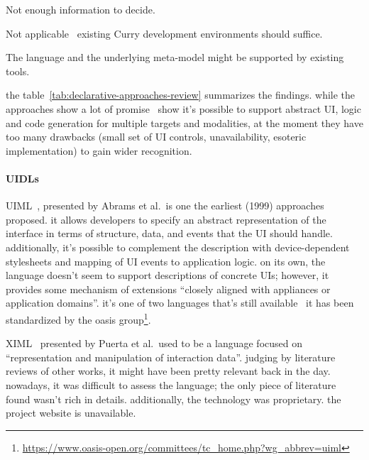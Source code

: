 \begin{table}[]
\begin{threeparttable}[b]
\begin{tabularx}{\textwidth}{lrCCC}
            \bottomrule
        \end{tabularx}
        \begin{tablenotes}
            \item [1] Not enough information to decide.
            \item [2] Not applicable \textemdash\ existing Curry development environments should suffice.
            \item [3] The language and the underlying meta-model might be supported by existing tools.
        \end{tablenotes}
    \end{threeparttable}
\end{table}

the table~\ref{tab:declarative-approaches-review} summarizes the findings.
while the approaches show a lot of promise \textemdash\ show it's possible to support abstract UI, logic and code generation for multiple targets and modalities, at the moment they have too many drawbacks (small set of UI controls, unavailability, esoteric implementation) to gain wider recognition.

\paragraph{UIDLs}

UIML~\cite{Abrams1999-ei}, presented by Abrams et al.\ is one the earliest (1999) approaches proposed.
it allows developers to specify an abstract representation of the interface in terms of structure, data, and events that the UI should handle.
additionally, it's possible to complement the description with device-dependent stylesheets and mapping of UI events to application logic.
on its own, the language doesn't seem to support descriptions of concrete UIs;
however, it provides some mechanism of extensions \enquote{closely aligned with appliances or application domains}.
it's one of two languages that's still available \textemdash\ it has been standardized by the oasis group\footnote{\url{https://www.oasis-open.org/committees/tc_home.php?wg_abbrev=uiml}}.

XIML~\cite{puerta2001ximl} presented by Puerta et al.\ used to be a language focused on \enquote{representation and manipulation of interaction data}.
judging by literature reviews of other works, it might have been pretty relevant back in the day.
nowadays, it was difficult to assess the language;
the only piece of literature found wasn't rich in details.
additionally, the technology was proprietary.
the project website is unavailable.


